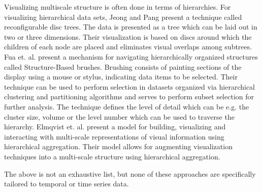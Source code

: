 Visualizing multiscale structure is often done in terms of hierarchies. For visualizing hierarchical data sets, 
Jeong and Pang \cite{729555} present a technique called reconfigurable disc trees. The data is presented as a tree which can be laid out in two or three dimensions.
Their visualization is based on discs around which the children of each node are placed and eliminates
visual overlaps among subtrees.
%
%
Fua et. al. \cite{Fua:2000:SBM:614278.614457} present a mechanism for navigating hierarchically organized structures
called Structure-Based brushes. Brushing consists of painting sections of the display using a mouse or stylus, indicating
data items to be selected. Their technique can be used to perform selection in datasets organized via hierarchical
clustering and partitioning algorithms and serves to perform subset selection for further analysis. The technique defines
the level of detail which can be e.g. the cluster size, volume or the level number which can be used to traverse the
hierarchy.
%
Elmqvist et. al. \cite{Elmqvist:2010:HAI:1749404.1749525} present a model for building, visualizing and interacting with
multi-scale representations of visual information using hierarchical aggregation. Their model allows for augmenting visualization
techniques into a multi-scale structure using hierarchical aggregation.


The above is not an exhaustive list, but none of these approaches are specifically tailored to temporal or time series data.


